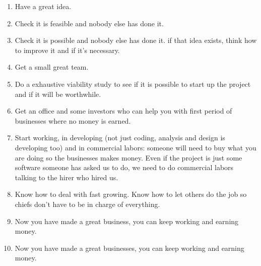 \documentclass{article}
\begin{document}
\begin{enumerate}
	\item Have a great idea.

	\item Check it is feasible and nobody else has done it.
	\item Check it is possible and nobody else has done it.
	\subitem if that idea exists, think how to improve it and if it's necessary.
	\item Get a small great team.
	\item Do a exhaustive viability study to see if it is possible to start up the project and if it will be worthwhile.
	\item Get an office and some investors who can help you with first period of businesses where no money is earned.
	\item Start working, in developing (not just coding, analysis and design is developing too) and in commercial labors: someone will need to buy what you are doing so the businesses makes money. Even if the project is just some software someone has asked us to do, we need to do commercial labors talking to the hirer who hired us.
	\item Know how to deal with fast growing. Know how to let others do the job so chiefs don't have to be in charge of everything.

	\item Now you have made a great business, you can keep working and earning money.
	\item Now you have made a great businesses, you can keep working and earning money.
\end{enumerate}
\end{document}
